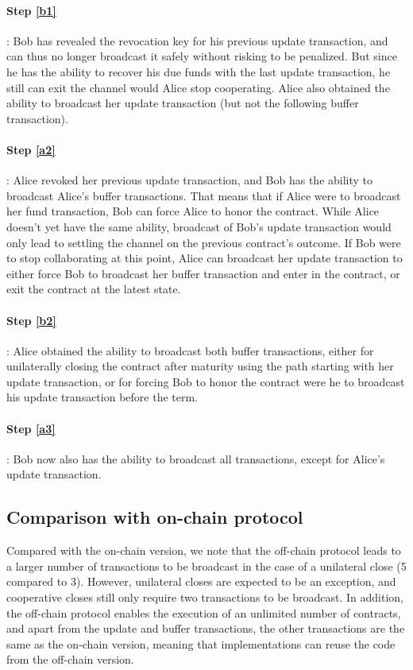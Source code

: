 \paragraph{Step \ref{b1}}: Bob has revealed the revocation key for his previous update transaction, and can thus no longer broadcast it safely without risking to be penalized.
But since he has the ability to recover his due funds with the last update transaction, he still can exit the channel would Alice stop cooperating.
Alice also obtained the ability to broadcast her update transaction (but not the following buffer transaction).

\paragraph{Step \ref{a2}}: Alice revoked her previous update transaction, and Bob has the ability to broadcast Alice's buffer transactions.
That means that if Alice were to broadcast her fund transaction, Bob can force Alice to honor the contract.
While Alice doesn't yet have the same ability, broadcast of Bob's update transaction would only lead to settling the channel on the previous contract's outcome.
If Bob were to stop collaborating at this point, Alice can broadcast her update transaction to either force Bob to broadcast her buffer transaction and enter in the contract, or exit the contract at the latest state.

\paragraph{Step \ref{b2}}: Alice obtained the ability to broadcast both buffer transactions, either for unilaterally closing the contract after maturity using the path starting with her update transaction, or for forcing Bob to honor the contract were he to broadcast his update transaction before the term.

\paragraph{Step \ref{a3}}: Bob now also has the ability to broadcast all transactions, except for Alice's update transaction.

\subsection{Comparison with on-chain protocol}

Compared with the on-chain version, we note that the off-chain protocol leads to a larger number of transactions to be broadcast in the case of a unilateral close (5 compared to 3).
However, unilateral closes are expected to be an exception, and cooperative closes still only require two transactions to be broadcast.
In addition, the off-chain protocol enables the execution of an unlimited number of contracts, and apart from the update and buffer transactions, the other transactions are the same as the on-chain version, meaning that implementations can reuse the code from the off-chain version.